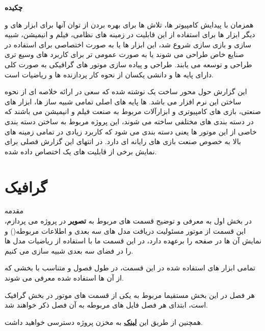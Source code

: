 \documentclass[a4paper, 12pt]{book}
\makeatletter
\renewcommand\@endpart{\vfil
              \if@twoside
                \null
                \thispagestyle{empty}%
                \newpage
              \fi
              \if@tempswa
                \twocolumn
              \fi}
\makeatother
\begin{document}
\huge\textbf{چکیده}
\normalsize
\begin{flushright}
  همزمان با پیدایش کامپیوتر ها، تلاش ها برای بهره بردن از توان آنها برای ابزار های  و دیگر ابزار ها برای
  استفاده از این قابلیت در زمینه های نظامی، فیلم و انیمیشن، شبیه سازی و بازی سازی شروع شد، این ابزار ها یا به صورت
  اختصاصی برای استفاده در صنایع خاص طراحی می شوند یا به صورت عمومی تر برای کاربرد های وسیع تری طراحی و توسعه می یابند.
   طراحی و پیاده سازی موتور های گرافیکی به صورت کلی دارای پایه ها و دانشی یکسان از نحوه کار پردازنده ها و ریاضیات است.\par
   این گزارش حول محور ساخت یک  نوشته شده که سعی در ارائه خلاصه ای از نحوه ساختن این نرم افزار می باشد.  ها پایه های اصلی تمامی شبیه ساز ها، ابزار های صنعتی، بازی های کامپیوتری و ابزارآلات مربوط به صنعت فیلم و انیمیشن می باشند که در دسته بندی های مختلفی ساخته می شوند، این پروژه مربوط به ساختن دسته بندی خاصی از این موتور ها یعنی دسته بندی می شود که کاربرد زیادی در تمامی زمینه های بالا به خصوص صنعت بازی های رایانه ای دارد.
   در انتهای این گزارش فصلی برای نمایش برخی از قابلیت های یک  اختصاص داده شده.

\end{flushright}


\begingroup
  \hypersetup{hidelinks}
  \tableofcontents
\endgroup

\makeatletter
\renewcommand\@endpart{\vfil
              \if@twoside
                \null
                \thispagestyle{empty}%
                \newpage
              \fi
              \if@tempswa
                \twocolumn
              \fi}
\makeatother

\part{گرافیک}

\huge
    مقدمه \\

\vspace*{2cm}
\noindent
\normalsize
     در بخش اول به معرفی و توضیح قسمت های مربوط به \textbf{تصویر} در پروژه می پردازم،
     این قسمت از موتور مسئولیت دریافت مدل های سه بعدی و اطلاعات مربوطه()
     و نمایش آن ها در صفحه را برعهده دارد، در این قسمت ما با استفاده از ریاضیات مدل ها را در فضای سه بعدی شبیه سازی می کنیم.\par
     تمامی ابزار های استفاده شده در این  قسمت، در طول فصول و متناسب با بخشی که از آن ها استفاده شده معرفی می شوند.\par
     هر فصل در این بخش مستقیما مربوط به یکی از قسمت های موتور در بخش گرافیک است، ابتدای هر فصل فایل های مربوطه به آن فصل ذکر خواهند شد.\par
     همچنین از طریق این \href{https://github.com/devprofile98/shm}{\textbf{لینک}} 
     به مخزن پروژه دسترسی خواهید داشت.
\end{document}
